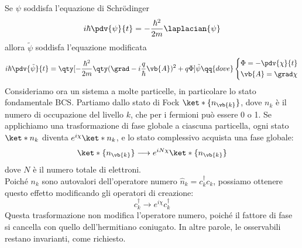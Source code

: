 Se $\psi$ soddisfa l'equazione di Schrödinger
\begin{equation*}
   i \hbar \pdv{\psi}{t}
   =-\frac{\hbar^2}{2m} \laplacian{\psi}
\end{equation*}
allora $\tilde{\psi}$ soddisfa l'equazione modificata
\begin{equation*}
   i \hbar \pdv{\tilde{\psi}}{t}
   =\qty[ -\frac{\hbar^2}{2m} \qty( \grad - i \frac{q}{\hbar} \vb{A} )^2 + q\Phi ] \tilde{\psi}
   \qq{dove}
   \begin{dcases}
   \Phi = -\pdv{\chi}{t}
   \\
   \vb{A} = \grad \chi
   \end{dcases}
\end{equation*}
Consideriamo ora un sistema a molte particelle, in particolare lo stato fondamentale BCS. Partiamo dallo stato di Fock $\ket*{\{ n_{\vb{k}} \} }$, dove $n_k$ è il numero di occupazione del livello $k$, che per i fermioni può essere 0 o 1. Se applichiamo una trasformazione di fase globale a ciascuna particella, ogni stato $\ket*{n_k}$ diventa $e^{i\chi} \ket*{n_k}$, e lo stato complessivo acquista una fase globale:
\begin{equation*}
   \ket*{\{ n_{\vb{k}} \} }
   \longrightarrow
   e^{i N \chi} \ket*{\{ n_{\vb{k}} \} }
\end{equation*}
dove $N$ è il numero totale di elettroni.\\
Poiché $n_k$ sono autovalori dell'operatore numero $\hat{n}_k = c_k^\dagger c_k$, possiamo ottenere questo effetto modificando gli operatori di creazione:
\begin{equation*}
   c_k^\dagger \longrightarrow e^{i\chi} c_k^\dagger
\end{equation*}
Questa trasformazione non modifica l'operatore numero, poiché il fattore di fase si cancella con quello dell'hermitiano coniugato. In altre parole, le osservabili restano invarianti, come richiesto.
